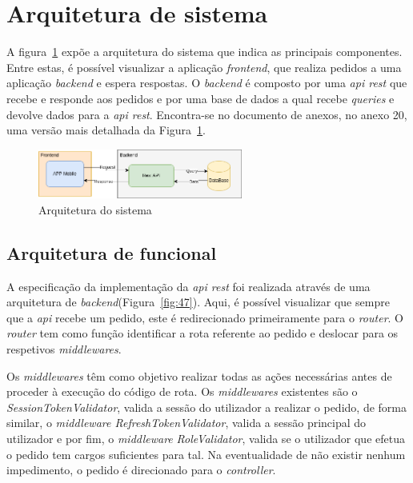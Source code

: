 \section{Arquitetura de sistema}
A figura~\ref{fig:46} expõe a arquitetura do sistema que indica as principais componentes. Entre estas, é possível visualizar a aplicação \textit{frontend}, que realiza pedidos a uma aplicação \textit{backend} e espera respostas. O \textit{backend} é composto por uma \textit{\textit{\acrshort{api}} rest} que recebe e responde aos pedidos e por uma base de dados a qual recebe \textit{queries} e devolve dados para a \textit{\textit{\acrshort{api}} rest}. Encontra-se no documento de anexos, no anexo 20, uma versão mais detalhada da Figura~\ref*{fig:46}.

\begin{figure}[htb]
  \centering
  
  \includegraphics[width=0.6\textwidth]{images/Arquiteturas/arquitetura_de_solucao.png}
  \caption{Arquitetura do sistema}
  \label{fig:46}
\end{figure}

\subsection{Arquitetura de funcional}
A especificação da implementação da \textit{\textit{\acrshort{api}} rest} foi realizada através de uma arquitetura de \textit{backend}(Figura~\ref{fig:47}). Aqui, é possível visualizar que sempre que a \textit{\acrshort{api}} recebe um pedido, este é redirecionado primeiramente para o \textit{router}. O \textit{router} tem como função identificar a rota referente ao pedido e deslocar para os respetivos \textit{middlewares}. 

Os \textit{middlewares} têm como objetivo realizar todas as ações necessárias antes de proceder à execução do código de rota. Os \textit{middlewares} existentes são o \textit{SessionTokenValidator}, valida a sessão do utilizador a realizar o pedido, de forma similar, o \textit{middleware RefreshTokenValidator}, valida a sessão principal do utilizador e por fim, o \textit{middleware} \textit{RoleValidator}, valida se o utilizador que efetua o pedido tem cargos suficientes para tal. Na eventualidade de não existir nenhum impedimento, o pedido é direcionado para o \textit{controller}.

